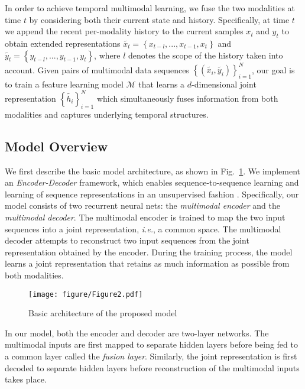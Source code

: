 \documentclass[10pt,twocolumn,letterpaper]{article}
\begin{document}
In order to achieve temporal multimodal learning, we fuse the two modalities at time $t$ by considering both their current state and history. Specifically, at time $t$ we append the recent per-modality history to the current samples $x_t$ and $y_t$ to obtain extended representations $\tilde{x_t}=\left \{x_{t-l},...,x_{t-1},x_{t} \right\}$ and $\tilde{y_t}=\left \{y_{t-l},...,y_{t-1},y_{t} \right\}$, where $l$ denotes the scope of the history taken into account. Given pairs of multimodal data sequences $\left\{ \left( \tilde{x_i}, \tilde{y_i} \right) \right\}_{i=1}^N$, our goal is to train a feature learning model $\mathcal{M}$ that learns a $d$-dimensional joint representation $\left\{ \tilde{h_i} \right\}_{i=1}^N$ which simultaneously fuses information from both modalities and captures underlying temporal structures.

\subsection{Model Overview}
We first describe the basic model architecture, as shown in Fig.~\ref{fig:fig2}. We implement an \textit{Encoder-Decoder} framework, which enables sequence-to-sequence learning \cite{sutskever2014sequence} and learning of sequence representations in an unsupervised fashion \cite{srivastava2015unsupervised}. Specifically, our model consists of two recurrent neural nets: the \textit{multimodal encoder} and the \textit{multimodal decoder}. The multimodal encoder is trained to map the two input sequences into a joint representation, \textit{i.e.}, a common space. The multimodal decoder attempts to reconstruct two input sequences from the joint representation obtained by the encoder. During the training process, the model learns a joint representation that retains as much information as possible from both modalities.

\begin{figure}
\begin{center}
\texttt{[image: figure/Figure2.pdf]}
\end{center}
\caption{Basic architecture of the proposed model}
\label{fig:fig2}
\vspace{-1em}
\end{figure}

In our model, both the encoder and decoder are two-layer networks. The multimodal inputs are first mapped to separate hidden layers before being fed to a common layer called the \textit{fusion layer}. Similarly, the joint representation is first decoded to separate hidden layers before reconstruction of the multimodal inputs takes place.
 
\end{document}
